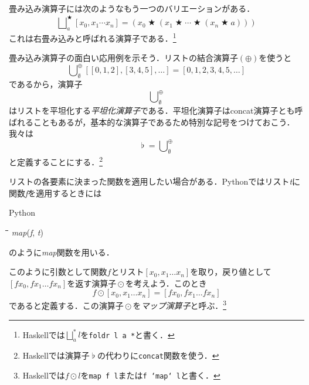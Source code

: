 \documentclass[twocolumn]{jsbook}
\newcommand{\programminglanguage}[1]{\textsf{#1}}
\newcommand{\haskell}{\programminglanguage{Haskell}}
\newcommand{\python}{\programminglanguage{Python}}
\newcommand{\code}[1]{\texttt{#1}}
\newcommand{\keyword}[1]{{\emph{#1}}}
\newenvironment{pythoncode}{\begin{itembox}[r]{\python}}{\end{itembox}}
\newenvironment{pythontab}{\begin{tabbing}\hspace*{1em}\=\hspace*{1em}\=\hspace*{1em}\=\hspace*{1em}\=\kill}{\end{tabbing}}
\newcommand{\pthnId}[1]{\textit{#1}}
\newcommand{\hsklAppend}{\oplus}
\DeclareMathOperator{\hsklConcat}{\flat}
\DeclareMathOperator{\hsklMap}{\odot}
\newcommand{\hsklEmptyList}{\emptyset}
\DeclareMathOperator{\mathAnyBinaryOperator}{\bigstar}
\DeclareMathOperator*{\mathFold}{\bigcup}
\DeclareMathOperator*{\mathFoldRight}{\bigsqcup}
\begin{document}
畳み込み演算子には次のようなもう一つのバリエーションがある．
\begin{equation}
\mathFoldRight^{\mathAnyBinaryOperator}_{a}[x_0,x_1\dotsb x_n]=\left(x_0\mathAnyBinaryOperator\left(x_1\mathAnyBinaryOperator\dotsb\mathAnyBinaryOperator\left(x_n\mathAnyBinaryOperator a\right)\right)\right)
\end{equation}
これは右畳み込みと呼ばれる演算子である．\footnote{\haskell では$\mathFoldRight^{*}_{a}l$を\code{foldr l a *}と書く．}

畳み込み演算子の面白い応用例を示そう．リストの結合演算子$(\hsklAppend)$を使うと
\begin{equation}
\mathFold_\hsklEmptyList^\hsklAppend[[0,1,2],[3,4,5],\dots]=[0,1,2,3,4,5,\dots]
\end{equation}
であるから，演算子
\begin{equation}
\mathFold_\hsklEmptyList^\hsklAppend
\end{equation}
はリストを平坦化する\keyword{平坦化演算子}である．平坦化演算子はconcat演算子とも呼ばれることもあるが，基本的な演算子であるため特別な記号をつけておこう．我々は
\begin{equation}
\hsklConcat=\mathFold_\hsklEmptyList^\hsklAppend
\end{equation}
と定義することにする．\footnote{\haskell では演算子$\hsklConcat$の代わりに\code{concat}関数を使う．}

リストの各要素に決まった関数を適用したい場合がある．\python ではリスト\pthnId{t}に関数\pthnId{f}を適用するときには
\begin{pythoncode}
\begin{pythontab}
\pthnId{map}(\pthnId{f}, \pthnId{t})
\end{pythontab}
\end{pythoncode}
のように\pthnId{map}関数を用いる．

このように引数として関数$f$とリスト$[x_0,x_1\dots x_n]$を取り，戻り値として$[fx_0,fx_1\dots fx_n]$を返す演算子$\hsklMap$を考えよう．このとき
\begin{equation}
f\hsklMap[x_0,x_1\dots x_n]=[fx_0,fx_1\dots fx_n]
\end{equation}
であると定義する．この演算子$\hsklMap$を\keyword{マップ演算子}と呼ぶ．\footnote{\haskell では$f\hsklMap l$を\code{map f l}または\code{f `map` l}と書く．}
\end{document}
